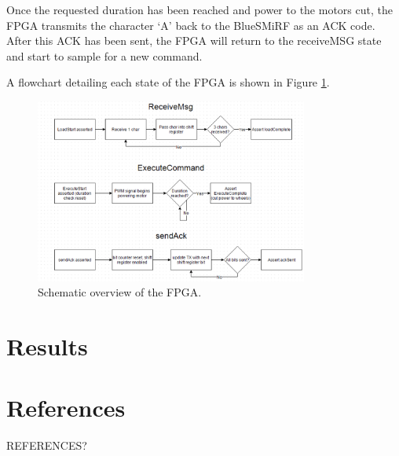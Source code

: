 \documentclass[12pt]{article}
\begin{document}
Once the requested duration has been reached and power to the motors cut, the FPGA transmits the character `A' back to the BlueSMiRF as an ACK code.  After this ACK has been sent, the FPGA will return to the receiveMSG state and start to sample for a new command.

A flowchart detailing each state of the FPGA is shown in Figure \ref{fig:fpgablock}.

\begin{figure}
\begin{center}
\includegraphics[width=0.8\textwidth]{FPGABlock}
\end{center}
\caption{Schematic overview of the FPGA.}
\label{fig:fpgablock}
\end{figure}

\section{Results}
\section{References}
\renewcommand{\refname}{}
\vspace{-1cm}
\begin{thebibliography}{widest entry}
REFERENCES?
\end{thebibliography}
\end{document}
